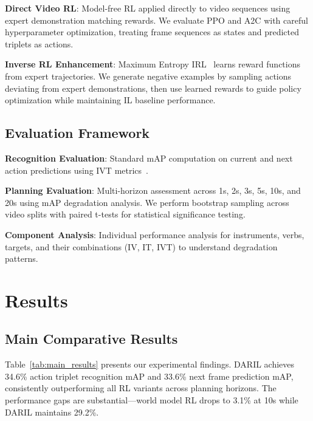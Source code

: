 \documentclass[runningheads]{llncs}
\begin{document}
\textbf{Direct Video RL}: Model-free RL applied directly to video sequences using expert demonstration matching rewards. We evaluate PPO and A2C with careful hyperparameter optimization, treating frame sequences as states and predicted triplets as actions.

\textbf{Inverse RL Enhancement}: Maximum Entropy IRL~\cite{ziebart2008maximum} learns reward functions from expert trajectories. We generate negative examples by sampling actions deviating from expert demonstrations, then use learned rewards to guide policy optimization while maintaining IL baseline performance.

\subsection{Evaluation Framework}

\textbf{Recognition Evaluation}: Standard mAP computation on current and next action predictions using IVT metrics~\cite{nwoye2022data}.

\textbf{Planning Evaluation}: Multi-horizon assessment across 1s, 2s, 3s, 5s, 10s, and 20s using mAP degradation analysis. We perform bootstrap sampling across video splits with paired t-tests for statistical significance testing.

\textbf{Component Analysis}: Individual performance analysis for instruments, verbs, targets, and their combinations (IV, IT, IVT) to understand degradation patterns.

\section{Results}

\subsection{Main Comparative Results}

Table~\ref{tab:main_results} presents our experimental findings. DARIL achieves 34.6\% action triplet recognition mAP and 33.6\% next frame prediction mAP, consistently outperforming all RL variants across planning horizons. The performance gaps are substantial—world model RL drops to 3.1\% at 10s while DARIL maintains 29.2\%.
\end{document}

